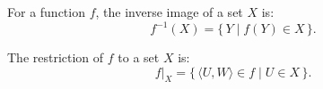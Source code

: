 For a function $f$, the inverse image of a set $X$ is:
$$f^{-1}(X) = \{\, Y \mid f(Y) \in X \,\}.$$

The restriction of $f$ to a set $X$ is:
$$f|_{X} = \{\, \langle U, W \rangle \in f \mid U \in X \,\}.$$
